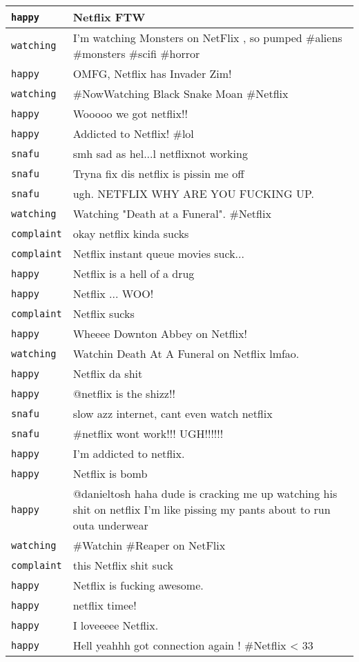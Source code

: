 \begin{center}
\begin{longtable}{|l|p{120mm}|}
      \tabularnewline\hline
         \texttt{happy} & Netflix FTW
      \tabularnewline\hline
         \texttt{watching} & I'm watching Monsters on NetFlix , so pumped \#aliens \#monsters \#scifi \#horror
      \tabularnewline\hline
         \texttt{happy} & OMFG, Netflix has Invader Zim!
      \tabularnewline\hline
         \texttt{watching} & \#NowWatching Black Snake Moan \#Netflix
      \tabularnewline\hline
         \texttt{happy} & Wooooo we got netflix!!
      \tabularnewline\hline
         \texttt{happy} & Addicted to Netflix! \#lol
      \tabularnewline\hline
         \texttt{snafu} & smh sad as hel...l netflixnot working
      \tabularnewline\hline
         \texttt{snafu} & Tryna fix dis netflix is pissin me off
      \tabularnewline\hline
         \texttt{snafu} & ugh. NETFLIX WHY ARE YOU FUCKING UP.
      \tabularnewline\hline
         \texttt{watching} & Watching "Death at a Funeral". \#Netflix
      \tabularnewline\hline
         \texttt{complaint} & okay netflix kinda sucks
      \tabularnewline\hline
         \texttt{complaint} & Netflix instant queue movies suck...
      \tabularnewline\hline
         \texttt{happy} & Netflix is a hell of a drug
      \tabularnewline\hline
         \texttt{happy} & Netflix ... WOO!
      \tabularnewline\hline
         \texttt{complaint} & Netflix sucks
      \tabularnewline\hline
         \texttt{happy} & Wheeee Downton Abbey on Netflix!
      \tabularnewline\hline
         \texttt{watching} & Watchin Death At A Funeral on Netflix lmfao.
      \tabularnewline\hline
         \texttt{happy} & Netflix da shit
      \tabularnewline\hline
         \texttt{happy} & @netflix is the shizz!!
      \tabularnewline\hline
         \texttt{snafu} & slow azz internet, cant even watch netflix
      \tabularnewline\hline
         \texttt{snafu} & \#netflix wont work!!! UGH!!!!!!
      \tabularnewline\hline
         \texttt{happy} & I'm addicted to netflix.
      \tabularnewline\hline
         \texttt{happy} & Netflix is bomb
      \tabularnewline\hline
         \texttt{happy} & @danieltosh haha dude is cracking me up watching his shit on netflix I'm like pissing my pants about to run outa underwear
      \tabularnewline\hline
         \texttt{watching} & \#Watchin \#Reaper on NetFlix
      \tabularnewline\hline
         \texttt{complaint} & this Netflix shit suck
      \tabularnewline\hline
         \texttt{happy} & Netflix is fucking awesome.
      \tabularnewline\hline
         \texttt{happy} & netflix timee!
      \tabularnewline\hline
         \texttt{happy} & I loveeeee Netflix.
      \tabularnewline\hline
         \texttt{happy} & Hell yeahhh got connection again ! \#Netflix < 33

\end{longtable}
\end{center}

